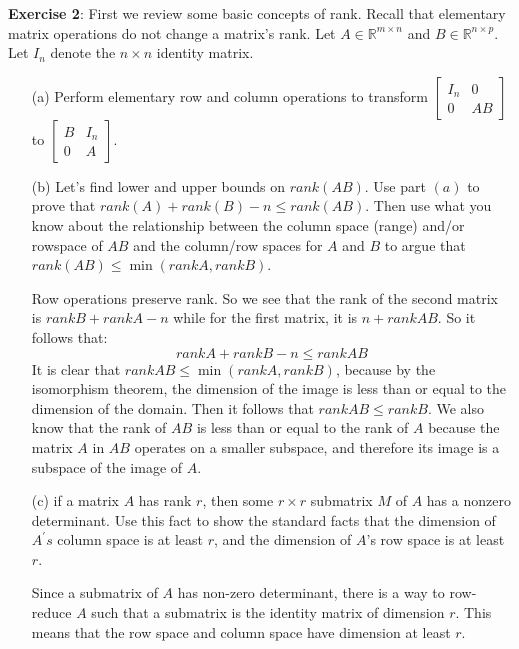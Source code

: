 \documentclass{article}
\begin{document}
\textbf{Exercise 2}: First we review some basic concepts of rank. Recall that elementary matrix operations do not change a matrix's rank. Let $A \in \mathbb{R}^{m \times n}$ and $B \in \mathbb{R}^{n \times p}$. Let $I_{n}$ denote the $n \times n$ identity matrix.
    \begin{itemize}
        \item [(a)] Perform elementary row and column operations to transform $\begin{bmatrix}
            I_{n} & 0  \\
            0     & AB   
        \end{bmatrix}$ to $\begin{bmatrix}
            B & I_{n} \\
            0 & A       
        \end{bmatrix}$.
            \begin{answer}
            \end{answer}

        \item [(b)] Let's find lower and upper bounds on $rank(AB)$. Use part $(a)$ to prove that $rank(A) + rank(B) - n \leq rank(AB)$. Then use what you know about the relationship between the column space (range) and/or rowspace of $AB$ and the column/row spaces for $A$ and $B$ to argue that $rank(AB) \leq \min(rank{A}, rank{B})$.
            \begin{answer}
                Row operations preserve rank. So we see that the rank of the second matrix is $rank{B} + rank{A} - n$ while for the first matrix, it is $n + rank{AB}$. So it follows that:
                    \begin{equation*}
                        rank{A} + rank{B} - n \leq rank{AB}
                    \end{equation*}
                It is clear that $rank{AB} \leq \min(rank{A}, rank{B})$, because by the isomorphism theorem, the dimension of the image is less than or equal to the dimension of the domain. Then it follows that $rank{AB} \leq rank{B}$. We also know that the rank of $AB$ is less than or equal to the rank of $A$ because the matrix $A$ in $AB$ operates on a smaller subspace, and therefore its image is a subspace of the image of $A$.
            \end{answer}

        \item [(c)] if a matrix $A$ has rank $r$, then some $r \times r$ submatrix $M$ of $A$ has a nonzero determinant. Use this fact to show the standard facts that the dimension of $A^{\prime}s$ column space is at least $r$, and the dimension of $A$'s row space is at least $r$.
            \begin{answer}
                Since a submatrix of $A$ has non-zero determinant, there is a way to row-reduce $A$ such that a submatrix is the identity matrix of dimension $r$. This means that the row space and column space have dimension at least $r$.
            \end{answer}


\end{itemize}
\end{document}
